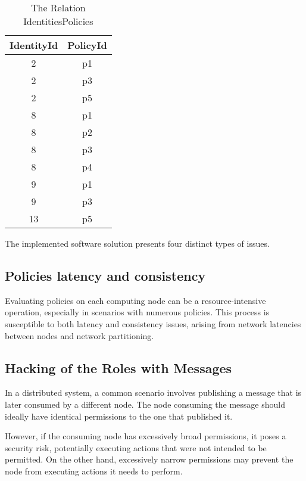 \begin{table*}[htbp]
    \caption{The Relation IdentitiesPolicies}
    \label{table:table-identities-policies}
    \begin{center}
    \begin{tabular}{|c|c|}
    \hline
    IdentityId & PolicyId\\
    \hline
    2 & p1\\
    \hline
    2 & p3\\
    \hline
    2 & p5\\
    \hline
    8 & p1\\
    \hline
    8 & p2\\
    \hline
    8 & p3\\
    \hline
    8 & p4\\
    \hline
    9 & p1\\
    \hline
    9 & p3\\
    \hline
    13 & p5\\
    \hline
    \end{tabular}
    \end{center}
\end{table*}


\newpage

The implemented software solution presents four distinct types of issues.

\subsection{Policies latency and consistency}
\label{sec:policies-latency-consistency}

Evaluating policies on each computing node can be a resource-intensive operation, especially in scenarios with numerous policies. This process is susceptible to both latency and consistency issues, arising from network latencies between nodes and network partitioning.

\subsection{Hacking of the Roles with Messages}
\label{sec:hacking-role-messages}

In a distributed system, a common scenario involves publishing a message that is later consumed by a different node.
The node consuming the message should ideally have identical permissions to the one that published it.

However, if the consuming node has excessively broad permissions, it poses a security risk, potentially executing actions that were not intended to be permitted. 
On the other hand, excessively narrow permissions may prevent the node from executing actions it needs to perform.

